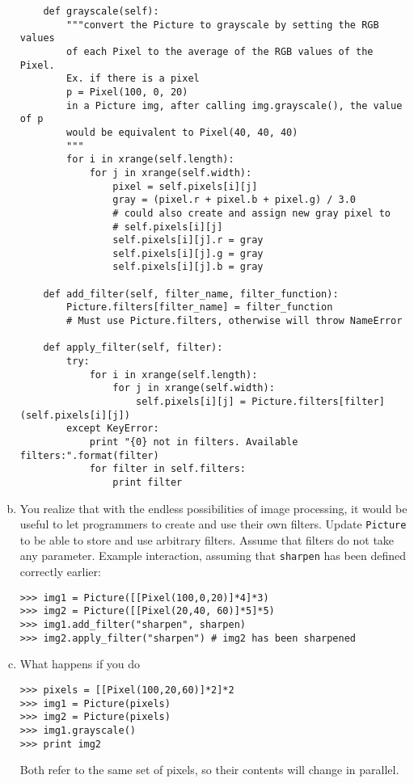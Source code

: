 \documentclass[11pt]{article}
\begin{document}
\begin{enumerate}[a)]
\begin{verbatim}
    def grayscale(self):
        """convert the Picture to grayscale by setting the RGB values
        of each Pixel to the average of the RGB values of the Pixel.
        Ex. if there is a pixel
        p = Pixel(100, 0, 20)        
        in a Picture img, after calling img.grayscale(), the value of p
        would be equivalent to Pixel(40, 40, 40)
        """
        for i in xrange(self.length):
            for j in xrange(self.width):
                pixel = self.pixels[i][j]
                gray = (pixel.r + pixel.b + pixel.g) / 3.0
                # could also create and assign new gray pixel to 
                # self.pixels[i][j]
                self.pixels[i][j].r = gray
                self.pixels[i][j].g = gray
                self.pixels[i][j].b = gray

    def add_filter(self, filter_name, filter_function):
        Picture.filters[filter_name] = filter_function
        # Must use Picture.filters, otherwise will throw NameError
        
    def apply_filter(self, filter):
        try:
            for i in xrange(self.length):
                for j in xrange(self.width):
                    self.pixels[i][j] = Picture.filters[filter](self.pixels[i][j])
        except KeyError:
            print "{0} not in filters. Available filters:".format(filter)
            for filter in self.filters:
                print filter
\end{verbatim}

\item You realize that with the endless possibilities of image processing, it would be useful to let programmers to create and use their own filters. Update \texttt{Picture} to be able to store and use arbitrary filters. Assume that filters do not take any parameter. Example interaction, assuming that \texttt{sharpen} has been defined correctly earlier:
\begin{verbatim}
>>> img1 = Picture([[Pixel(100,0,20)]*4]*3) 
>>> img2 = Picture([[Pixel(20,40, 60)]*5]*5) 
>>> img1.add_filter("sharpen", sharpen)
>>> img2.apply_filter("sharpen") # img2 has been sharpened
\end{verbatim}

\item What happens if you do
\begin{verbatim}
>>> pixels = [[Pixel(100,20,60)]*2]*2
>>> img1 = Picture(pixels)
>>> img2 = Picture(pixels)
>>> img1.grayscale()
>>> print img2

\end{verbatim}
Both refer to the same set of pixels, so their contents will change in parallel.
\end{enumerate}
\end{document}
